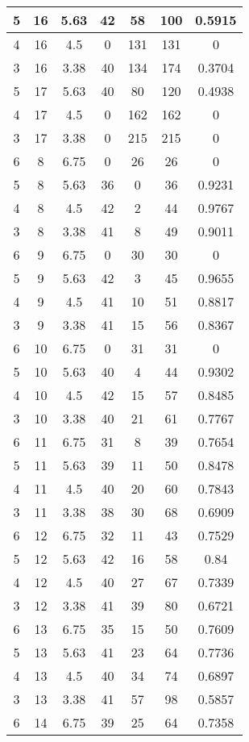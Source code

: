 \documentclass[letterpaper, 12pt]{article}
\begin{document}
\begin{longtable}{|c|c|c|c|c|c|c|}
\hline
5 & 16 & 5.63 & 42 & 58 & 100 & 0.5915 \\
\hline
4 & 16 & 4.5 & 0 & 131 & 131 & 0 \\
\hline
3 & 16 & 3.38 & 40 & 134 & 174 & 0.3704 \\
\hline
5 & 17 & 5.63 & 40 & 80 & 120 & 0.4938 \\
\hline
4 & 17 & 4.5 & 0 & 162 & 162 & 0 \\
\hline
3 & 17 & 3.38 & 0 & 215 & 215 & 0 \\
\hline
6 & 8 & 6.75 & 0 & 26 & 26 & 0 \\
\hline
5 & 8 & 5.63 & 36 & 0 & 36 & 0.9231 \\
\hline
4 & 8 & 4.5 & 42 & 2 & 44 & 0.9767 \\
\hline
3 & 8 & 3.38 & 41 & 8 & 49 & 0.9011 \\
\hline
6 & 9 & 6.75 & 0 & 30 & 30 & 0 \\
\hline
5 & 9 & 5.63 & 42 & 3 & 45 & 0.9655 \\
\hline
4 & 9 & 4.5 & 41 & 10 & 51 & 0.8817 \\
\hline
3 & 9 & 3.38 & 41 & 15 & 56 & 0.8367 \\
\hline
6 & 10 & 6.75 & 0 & 31 & 31 & 0 \\
\hline
5 & 10 & 5.63 & 40 & 4 & 44 & 0.9302 \\
\hline
4 & 10 & 4.5 & 42 & 15 & 57 & 0.8485 \\
\hline
3 & 10 & 3.38 & 40 & 21 & 61 & 0.7767 \\
\hline
6 & 11 & 6.75 & 31 & 8 & 39 & 0.7654 \\
\hline
5 & 11 & 5.63 & 39 & 11 & 50 & 0.8478 \\
\hline
4 & 11 & 4.5 & 40 & 20 & 60 & 0.7843 \\
\hline
3 & 11 & 3.38 & 38 & 30 & 68 & 0.6909 \\
\hline
6 & 12 & 6.75 & 32 & 11 & 43 & 0.7529 \\
\hline
5 & 12 & 5.63 & 42 & 16 & 58 & 0.84 \\
\hline
4 & 12 & 4.5 & 40 & 27 & 67 & 0.7339 \\
\hline
3 & 12 & 3.38 & 41 & 39 & 80 & 0.6721 \\
\hline
6 & 13 & 6.75 & 35 & 15 & 50 & 0.7609 \\
\hline
5 & 13 & 5.63 & 41 & 23 & 64 & 0.7736 \\
\hline
4 & 13 & 4.5 & 40 & 34 & 74 & 0.6897 \\
\hline
3 & 13 & 3.38 & 41 & 57 & 98 & 0.5857 \\
\hline
6 & 14 & 6.75 & 39 & 25 & 64 & 0.7358 \\

\end{longtable}
\end{document}
